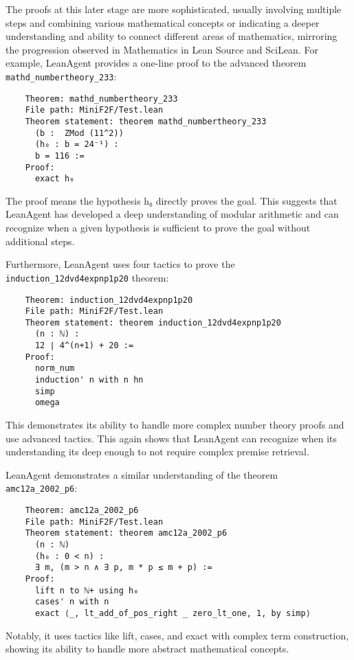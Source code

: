 \documentclass{article} %
\begin{document}
The proofs at this later stage are more sophisticated, usually involving multiple steps and combining various mathematical concepts or indicating a deeper understanding and ability to connect different areas of mathematics, mirroring the progression observed in Mathematics in Lean Source and SciLean. For example, LeanAgent provides a one-line proof to the advanced theorem \texttt{mathd\_numbertheory\_233}:

\begin{verbatim}
    Theorem: mathd_numbertheory_233
    File path: MiniF2F/Test.lean
    Theorem statement: theorem mathd_numbertheory_233
      (b :  ZMod (11^2))
      (h₀ : b = 24⁻¹) :
      b = 116 :=
    Proof:
      exact h₀
\end{verbatim}

The proof means the hypothesis h₀ directly proves the goal. This suggests that LeanAgent has developed a deep understanding of modular arithmetic and can recognize when a given hypothesis is sufficient to prove the goal without additional steps.

Furthermore, LeanAgent uses four tactics to prove the \texttt{induction\_12dvd4expnp1p20} theorem:

\begin{verbatim}
    Theorem: induction_12dvd4expnp1p20
    File path: MiniF2F/Test.lean
    Theorem statement: theorem induction_12dvd4expnp1p20
      (n : ℕ) :
      12 ∣ 4^(n+1) + 20 :=
    Proof:
      norm_num
      induction' n with n hn
      simp
      omega
\end{verbatim}

This demonstrates its ability to handle more complex number theory proofs and use advanced tactics. This again shows that LeanAgent can recognize when its understanding its deep enough to not require complex premise retrieval.

LeanAgent demonstrates a similar understanding of the theorem \texttt{amc12a\_2002\_p6}:

\begin{verbatim}
    Theorem: amc12a_2002_p6
    File path: MiniF2F/Test.lean
    Theorem statement: theorem amc12a_2002_p6
      (n : ℕ)
      (h₀ : 0 < n) :
      ∃ m, (m > n ∧ ∃ p, m * p ≤ m + p) :=
    Proof:
      lift n to ℕ+ using h₀
      cases' n with n
      exact ⟨_, lt_add_of_pos_right _ zero_lt_one, 1, by simp⟩
\end{verbatim}

Notably, it uses tactics like lift, cases, and exact with complex term construction, showing its ability to handle more abstract mathematical concepts.
\end{document}
